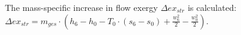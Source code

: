 The mass-specific increase in flow exergy \( \Delta ex_{str} \) is calculated:  
\( \Delta ex_{str} = m_{ges} \cdot \left( h_6 - h_0 - T_0 \cdot (s_6 - s_0) + \frac{w_6^2}{2} - \frac{w_0^2}{2} \right) \).
